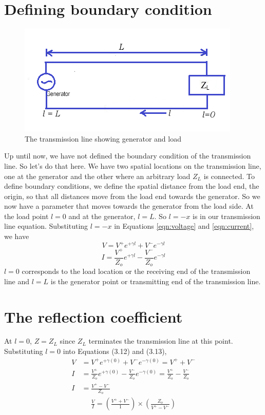 \section{Defining boundary condition}
\begin{figure}[h]
\centering
\includegraphics[scale=0.45]{./graphics/tlcircuit}
\caption{The transmission line showing generator and load}
\end{figure}
Up until now, we have not defined the boundary condition of the transmission line. So let's do that here. We have two spatial locations on the transmission line, one at the generator and the other where an arbitrary load $Z_L$ is connected. To define boundary conditions, we define the spatial distance from the load end, the origin, so that all distances move from the load end towards the generator. So we now have a parameter that moves towards the generator from the load side. At the load point $l = 0$ and at the generator, $l = L$. So $l = -x$ is in our transmission line equation. Substituting $l = -x$ in Equations \ref{eqn:voltage} and \ref{eqn:current}, we have
\begin{equation}
V = V^+e^{+\gamma l}+V^-e^{-\gamma l}
\label{eqn:voltagefromload}
\end{equation}
\begin{equation}
I = \frac{V^+}{Z_o}e^{+\gamma l}-\frac{V^-}{Z_o}e^{-\gamma l}
\label{eqn:currentfromload}
\end{equation}
$l = 0$ corresponds to the load location or the receiving end of the transmission line and $l = L$ is the generator point or transmitting end of the transmission line.

\section{The reflection coefficient}
At $l = 0$, $Z = Z_L$ since $Z_L$ terminates the transmission line at this point. Substituting $l = 0$ into Equations (3.12) and (3.13),
\begin{align*}
V &= V^+e^{+\gamma (0)}+V^-e^{-\gamma (0)} = V^+ + V^-\\
I &= \frac{V^+}{Z_o}e^{+\gamma (0)}-\frac{V^-}{Z_o}e^{-\gamma (0)} = \frac{V^+}{Z_o} - \frac{V^-}{Z_o} \\
I &= \frac{V^+ - V^-}{Z_o}
\end{align*}
\begin{align*}
\frac{V}{I} = \left( \frac{V^+ + V^-}{1}\right)  \times \left( \frac{Z_o}{V^+ - V^-}\right) 
\end{align*}


